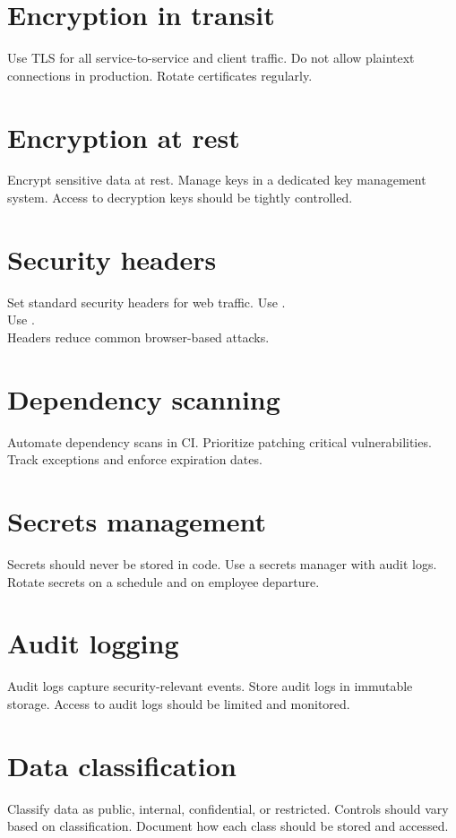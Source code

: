 \section{Encryption in transit}
Use TLS for all service-to-service and client traffic.
Do not allow plaintext connections in production.
Rotate certificates regularly.

\section{Encryption at rest}
Encrypt sensitive data at rest.
Manage keys in a dedicated key management system.
Access to decryption keys should be tightly controlled.

\section{Security headers}
Set standard security headers for web traffic.
Use .\\
Use .\\
Headers reduce common browser-based attacks.

\section{Dependency scanning}
Automate dependency scans in CI.
Prioritize patching critical vulnerabilities.
Track exceptions and enforce expiration dates.

\section{Secrets management}
Secrets should never be stored in code.
Use a secrets manager with audit logs.
Rotate secrets on a schedule and on employee departure.

\section{Audit logging}
Audit logs capture security-relevant events.
Store audit logs in immutable storage.
Access to audit logs should be limited and monitored.

\section{Data classification}
Classify data as public, internal, confidential, or restricted.
Controls should vary based on classification.
Document how each class should be stored and accessed.

